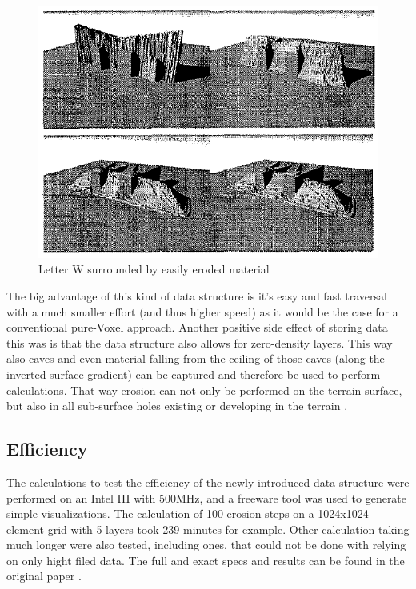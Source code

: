 \begin{figure}[htb]
	\centering
	\includegraphics[width=\linewidth]{MGG_10/8582.png}
	\caption{Letter W surrounded by easily eroded material}
	\label{fig:erosiondifference}
\end{figure}

The big advantage of this kind of data structure is it's easy and fast traversal with a much smaller effort (and thus higher speed) as it would be the case for a conventional pure-Voxel approach. Another positive side effect of storing data this was is that the data structure also allows for zero-density layers. This way also caves and even material falling from the ceiling of those caves (along the inverted surface gradient) can be captured and therefore be used to perform calculations. That way erosion can not only be performed on the terrain-surface, but also in all sub-surface holes existing or developing in the terrain \cite{marechal2010heat}.


\subsection{Efficiency}
The calculations to test the efficiency of the newly introduced data structure were performed on an Intel III with 500MHz, and a freeware tool was used to generate simple visualizations. The calculation of 100 erosion steps on a 1024x1024 element grid with 5 layers took 239 minutes for example. Other calculation taking much longer were also tested, including ones, that could not be done with relying on only hight filed data. The full and exact specs and results can be found in the original paper \cite{marechal2010heat}.